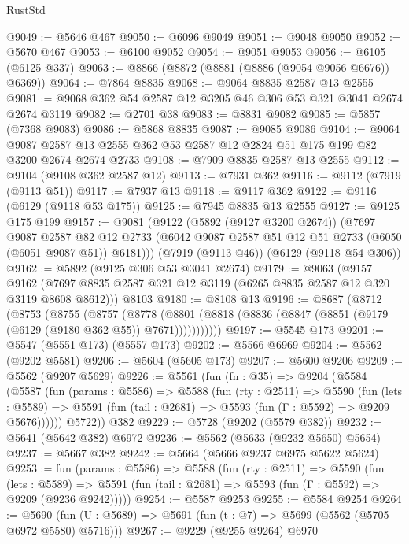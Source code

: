 \begin{lexlean}{RustStd}
\begin{coremodule}
@9049 := @5646 @467
@9050 := @6096 @9049
@9051 := @9048 @9050
@9052 := @5670 @467
@9053 := @6100 @9052
@9054 := @9051 @9053
@9056 := @6105 (@6125 @337)
@9063 := @8866 (@8872 (@8881 (@8886 (@9054 @9056 @6676)) @6369))
@9064 := @7864 @8835
@9068 := @9064 @8835 @2587 @13 @2555
@9081 := @9068 @362 @54 @2587 @12 @3205 @46 @306 @53 @321 @3041 @2674 @2674 @3119
@9082 := @2701 @38
@9083 := @8831 @9082
@9085 := @5857 (@7368 @9083)
@9086 := @5868 @8835
@9087 := @9085 @9086
@9104 := @9064
    @9087
    @2587
    @13
    @2555
    @362
    @53
    @2587
    @12
    @2824
    @51
    @175
    @199
    @82
    @3200
    @2674
    @2674
    @2733
@9108 := @7909 @8835 @2587 @13 @2555
@9112 := @9104 (@9108 @362 @2587 @12)
@9113 := @7931 @362
@9116 := @9112 (@7919 (@9113 @51))
@9117 := @7937 @13
@9118 := @9117 @362
@9122 := @9116 (@6129 (@9118 @53 @175))
@9125 := @7945 @8835 @13 @2555
@9127 := @9125 @175 @199
@9157 := @9081
    (@9122
      (@5892 (@9127 @3200 @2674))
      (@7697
        @9087
        @2587
        @82
        @12
        @2733
        (@6042 @9087 @2587 @51 @12 @51 @2733 (@6050 (@6051 @9087 @51)) @6181)))
    (@7919 (@9113 @46))
    (@6129 (@9118 @54 @306))
@9162 := @5892 (@9125 @306 @53 @3041 @2674)
@9179 := @9063
    (@9157 @9162 (@7697 @8835 @2587 @321 @12 @3119 (@6265 @8835 @2587 @12 @320 @3119 @8608 @8612)))
    @8103
@9180 := @8108 @13
@9196 := @8687
    (@8712
      (@8753
        (@8755
          (@8757
            (@8778
              (@8801 (@8818 (@8836 (@8847 (@8851 (@9179 (@6129 (@9180 @362 @55)) @7671)))))))))))
@9197 := @5545 @173
@9201 := @5547 (@5551 @173) (@5557 @173)
@9202 := @5566 @6969
@9204 := @5562 (@9202 @5581)
@9206 := @5604 (@5605 @173)
@9207 := @5600 @9206
@9209 := @5562 (@9207 @5629)
@9226 := @5561
    (fun (fn : @35) =>
    @9204
      (@5584
        (@5587
          (fun (params : @5586) =>
          @5588
            (fun (rty : @2511) =>
            @5590
              (fun (lets : @5589) =>
              @5591 (fun (tail : @2681) => @5593 (fun (Γ : @5592) => @9209 @5676))))))
        @5722))
    @382
@9229 := @5728 (@9202 (@5579 @382))
@9232 := @5641 (@5642 @382) @6972
@9236 := @5562 (@5633 (@9232 @5650) @5654)
@9237 := @5667 @382
@9242 := @5664 (@5666 @9237 @6975 @5622 @5624)
@9253 := fun (params : @5586) =>
  @5588
    (fun (rty : @2511) =>
    @5590
      (fun (lets : @5589) =>
      @5591 (fun (tail : @2681) => @5593 (fun (Γ : @5592) => @9209 (@9236 @9242)))))
@9254 := @5587 @9253
@9255 := @5584 @9254
@9264 := @5690 (fun (U : @5689) => @5691 (fun (t : @7) => @5699 (@5562 (@5705 @6972 @5580) @5716)))
@9267 := @9229 (@9255 @9264) @6970

\end{coremodule}
\end{lexlean}

